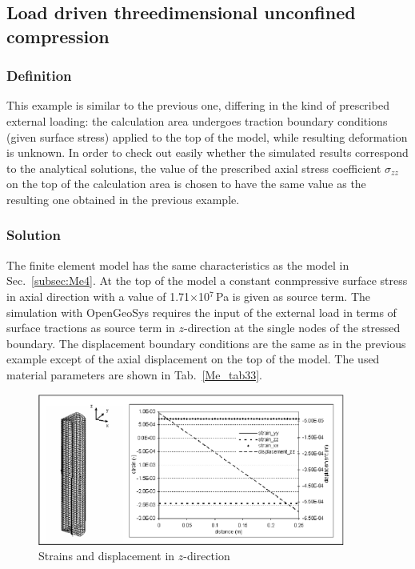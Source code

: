 \subsection{Load driven threedimensional unconfined compression}
\label{subsec:Me5}

\subsubsection{Definition}
\label{subsubsec:Me5_def}

This example is similar to the previous one, differing in the kind of prescribed external loading: the calculation area undergoes traction boundary conditions (given surface stress) applied to the top of the model, while resulting deformation is unknown. In order to check out easily whether the simulated results correspond to the analytical solutions, the value of the prescribed axial stress coefficient $\sigma_{zz}$ on the top of the calculation area is chosen to have the same value as the resulting one obtained in the previous example.

\subsubsection{Solution}
\label{subsubsec:Me5_sol}

The finite element model has the same characteristics as the model in Sec.~\ref{subsec:Me4}. At the top of the model a constant conmpressive surface stress in axial direction with a value of 1.71$\times$10$^7$\,Pa is given as source term. The simulation with OpenGeoSys requires the input of the external load in terms of surface tractions as source term in $z$-direction at the single nodes of the stressed boundary. The displacement boundary conditions are the same as in the previous example except of the axial displacement on the top of the model. The used material parameters are shown in Tab.~\ref{Me_tab33}.


\begin{figure}[htbp]
\centering
\includegraphics[width=0.9\textwidth]{PART_II/M/fig34.eps}
\caption{Strains and displacement in $z$-direction}
\label{Me_fig34}
\end{figure}

